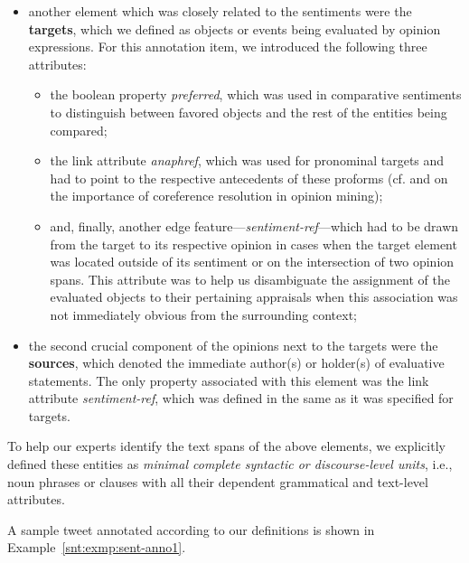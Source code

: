 \begin{itemize}
\item
  another element which was closely related to the sentiments were the
  \textbf{targets}, which we defined as objects or events being
  evaluated by opinion expressions.  For this annotation item, we
  introduced the following three attributes:
  \begin{itemize}
    \item
      the boolean property \emph{preferred}, which was used in
      comparative sentiments to distinguish between favored objects
      and the rest of the entities being compared;
    \item
      the link attribute \emph{anaphref}, which was used for
      pronominal targets and had to point to the respective
      antecedents of these proforms (cf. \citet{Stoyanov:06} and
      \citet{Ding:10} on the importance of coreference resolution in
      opinion mining);
    \item and, finally, another edge
      feature---\emph{sentiment-ref}---which had to be drawn from the
      target to its respective opinion in cases when the target
      element was located outside of its sentiment or on the
      intersection of two opinion spans.  This attribute was to help
      us disambiguate the assignment of the evaluated objects to their
      pertaining appraisals when this association was not immediately
      obvious from the surrounding context;
  \end{itemize}

\item
  the second crucial component of the opinions next to the targets
  were the \textbf{sources}, which denoted the immediate author(s) or
  holder(s) of evaluative statements.  The only property associated
  with this element was the link attribute \emph{sentiment-ref}, which
  was defined in the same as it was specified for targets.
\end{itemize}

To help our experts identify the text spans of the above elements, we
explicitly defined these entities as \emph{minimal complete syntactic
  or discourse-level units}, i.e., noun phrases or clauses with all
their dependent grammatical and text-level attributes.

A sample tweet annotated according to our definitions is shown in
Example~\ref{snt:exmp:sent-anno1}.

\begin{example}\label{snt:exmp:sent-anno1}
  \upshape{}\\[0.8em]
  \noindent{}
\end{example}

